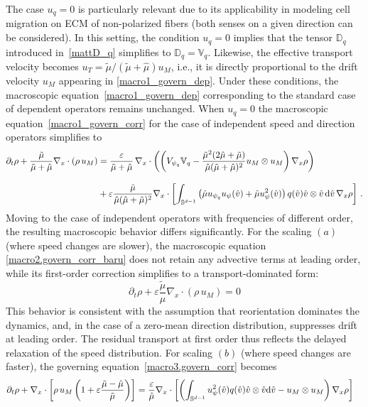 \documentclass[a4paper]{article}
\theoremstyle{Theorem}\newtheorem{proposition}{Proposition}[section]
\theoremstyle{Remark}\newtheorem{remark}{Remark}[section]
\theoremstyle{Theorem}\newtheorem{theorem}{Theorem}[section]
\newcommand{\hv}{\hat{v}}
\newcommand{\hmu}{\hat{\mu}}
\newcommand{\tmu}{\tilde{\mu}}
\newcommand{\intS}{\int_{\mathbb{S}^{d-1}}}
\begin{document}
The case $u_q=0$ is particularly relevant due to its applicability in modeling cell migration on ECM of non-polarized fibers (both senses on a given direction can be considered). In this setting, the condition $u_q=0$ implies that the tensor $\mathbb{D}_q$ introduced in~\eqref{mattD_q} simplifies to $\mathbb{D}_q=\mathbb{V}_q$. Likewise, the effective transport velocity becomes $u_T=\tmu/(\tmu+\hmu)u_M$, i.e., it is directly proportional to the drift velocity $u_M$ appearing in \eqref{macro1_govern_dep}. 
Under these conditions, the macroscopic equation~\eqref{macro1_govern_dep} corresponding to the standard case of dependent operators remains unchanged. When  $u_q=0$ the macroscopic equation~\eqref{macro1_govern_corr} for the case of independent speed and direction operators simplifies to
\begin{equation}\label{macro_Indp_SameFreq_Eq0}
\begin{split}
    \partial_t \rho +\dfrac{\tmu}{\tmu+\hmu} \nabla_x \cdot (\rho \, u_M) &=  \dfrac{\varepsilon}{\tmu+\hmu} \, \nabla_x \cdot\left(\left(V_{\psi_q}\mathbb{V}_q-\dfrac{\tmu^2(2\hmu+\tmu)}{\hmu(\tmu+\hmu)^2}u_M\otimes u_M\right) \nabla_x\rho\right)\\[0.3cm]
    &+\varepsilon\dfrac{\tmu}{\hmu(\hmu+\tmu)^2}\nabla_x\cdot \left[\intS \left(\hmu u_{\psi_q} u_\psi(\hv)+\tmu u_\psi^2(\hv)\right) q(\hv)\hv\otimes\hv\,{\rm d}\hv\,\nabla_x\rho\right]\,.
    \end{split}
\end{equation}
Moving to the case of independent operators with frequencies of different order, the resulting macroscopic behavior differs significantly. For the scaling $(a)$ (where speed changes are slower), the macroscopic equation \eqref{macro2.govern_corr_baru} does not retain any advective terms at leading order, while its first-order correction simplifies to a transport-dominated form:
\begin{equation*}\label{macro2.Eq0}
    \partial_t \rho +\varepsilon\dfrac{\tmu}{\hmu}\nabla_x \cdot \left(\rho\, u_M\right)=0
\end{equation*}
This behavior is consistent with the assumption that reorientation dominates the dynamics, and, in the case of a zero-mean direction distribution, suppresses drift at leading order. The residual transport at first order thus reflects the delayed relaxation of the speed distribution.
For scaling $(b)$ (where speed changes are faster), the governing equation~\eqref{macro3.govern_corr} becomes
\begin{equation}\label{macro3.Eq0}
\begin{split}
    &\partial_t \rho +\nabla_x \cdot \left[\rho \,u_M\left(1+\varepsilon\dfrac{\tmu-\hmu}{\tmu}\right)\right]=\dfrac{\varepsilon}{\hmu}\nabla_x \cdot \left[\left(\intS u_\psi^2(\hv)q(\hv)\hv\otimes\hv{\rm d}\hv- u_M\otimes u_M\right) \nabla_x\rho\right]
    \end{split}
\end{equation}
\end{document}
